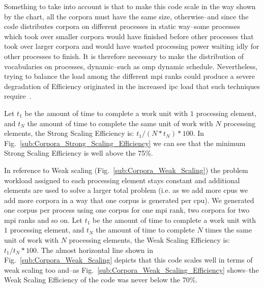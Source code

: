 \documentclass[10pt,journal,compsoc]{IEEEtran}
\begin{document}

Something to take into account is that to make this code scale in the way shown by the chart, all the corpora must have the same size, otherwise--and since the code distributes corpora on different processes in static way--some processes which took over smaller corpora would have finished before other processes that took over larger corpora and would have wasted processing power waiting idly for other processes to finish. It is therefore necessary to make the distribution of vocabularies on processes, dynamic--such as \gls{omp} dynamic schedule. Nevertheless, trying to balance the load among the different \gls{mpi} ranks could produce a severe degradation of Efficiency originated in the increased \gls{ipc} load that such techniques require~\cite{hu2012biophysically}.

Let $t_1$ be the amount of time to complete a work unit with $1$ processing element, and $t_N$ the amount of time to complete the same unit of work with $N$ processing elements, the Strong Scaling Efficiency is: $t_1 / (N * t_N) * 100$. In Fig.~\ref{sub:Corpora_Strong_Scaling_Efficiency} we can see that the minimum Strong Scaling Efficiency is well above the 75\%.

In reference to Weak scaling (Fig.~\ref{sub:Corpora_Weak_Scaling}) the problem workload assigned to each processing element stays constant and additional elements are used to solve a larger total problem (i.e. as we add more \glspl{cpu} we add more corpora in a way that one corpus is generated per \gls{cpu}). We generated one corpus per process using one corpus for one \gls{mpi} rank, two corpora for two \gls{mpi} ranks and so on. Let $t_1$ be the amount of time to complete a work unit with $1$ processing element, and $t_N$ the amount of time to complete $N$ times the same unit of work with $N$ processing elements, the Weak Scaling Efficiency is: $t_1 / t_N * 100$. The almost horizontal line shown in Fig.~\ref{sub:Corpora_Weak_Scaling} depicts that this code scales well in terms of weak scaling too and--as Fig.~\ref{sub:Corpora_Weak_Scaling_Efficiency} shows--the Weak Scaling Efficiency of the code was never below the 70\%.
\end{document}

